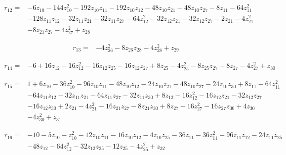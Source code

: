 \par\noindent\begin{minipage}{\linewidth}
\begin{align*}
r_{12}={}&-6z_{10}-144z_{10}^{2}-192z_{10}z_{11}-192z_{10}z_{12}-48z_{10}z_{21}-48z_{10}z_{27}-8z_{11}-64z_{11}^{2}\\[-2pt]
&-128z_{11}z_{12}-32z_{11}z_{21}-32z_{11}z_{27}-64z_{12}^{2}-32z_{12}z_{21}-32z_{12}z_{27}-2z_{21}-4z_{21}^{2}\\[-2pt]
&-8z_{21}z_{27}-4z_{27}^{2}+z_{28}
\end{align*}
\end{minipage}\par
\par\noindent\begin{minipage}{\linewidth}
\begin{align*}
r_{13}={}&-4z_{26}^{2}-8z_{26}z_{28}-4z_{28}^{2}+z_{29}
\end{align*}
\end{minipage}\par
\par\noindent\begin{minipage}{\linewidth}
\begin{align*}
r_{14}={}&-6+16z_{12}-16z_{12}^{2}-16z_{12}z_{25}-16z_{12}z_{27}+8z_{25}-4z_{25}^{2}-8z_{25}z_{27}+8z_{27}-4z_{27}^{2}+z_{30}
\end{align*}
\end{minipage}\par
\par\noindent\begin{minipage}{\linewidth}
\begin{align*}
r_{15}={}&1+6z_{10}-36z_{10}^{2}-96z_{10}z_{11}-48z_{10}z_{12}-24z_{10}z_{21}-48z_{10}z_{27}-24z_{10}z_{30}+8z_{11}-64z_{11}^{2}\\[-2pt]
&-64z_{11}z_{12}-32z_{11}z_{21}-64z_{11}z_{27}-32z_{11}z_{30}+8z_{12}-16z_{12}^{2}-16z_{12}z_{21}-32z_{12}z_{27}\\[-2pt]
&-16z_{12}z_{30}+2z_{21}-4z_{21}^{2}-16z_{21}z_{27}-8z_{21}z_{30}+8z_{27}-16z_{27}^{2}-16z_{27}z_{30}+4z_{30}\\[-2pt]
&-4z_{30}^{2}+z_{31}
\end{align*}
\end{minipage}\par
\par\noindent\begin{minipage}{\linewidth}
\begin{align*}
r_{16}={}&-10-5z_{10}-z_{10}^{2}-12z_{10}z_{11}-16z_{10}z_{12}-4z_{10}z_{25}-36z_{11}-36z_{11}^{2}-96z_{11}z_{12}-24z_{11}z_{25}\\[-2pt]
&-48z_{12}-64z_{12}^{2}-32z_{12}z_{25}-12z_{25}-4z_{25}^{2}+z_{32}
\end{align*}
\end{minipage}\par

